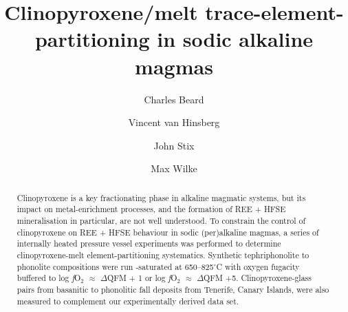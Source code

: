 \documentclass[review,authoryear,12pt]{elsarticle}
\newcommand{\dgC}{$^\circ$C }
\newcommand{\fO}{\textit{f}O$_{2}$ }
\begin{document}
\begin{frontmatter}


%

\title{Clinopyroxene/melt trace-element-partitioning in sodic alkaline magmas}


\author[1]{Charles Beard}

\author[1]{Vincent van Hinsberg}
\author[1]{John Stix}
\author[2,3]{Max Wilke}

\address[1]{Earth and Planetary Sciences, McGill University, 3450 University Street, Montreal, Qu\'ebec, H3A 0E8, Canada}
\address[2]{Institut f\"ur Erd- und Umweltwissenschaften, Universit\"at Potsdam, Golm, Germany}
\address[3]{Chemie und Physik der Geomaterialien, Deutsches GeoForschungsZentrum GFZ, Potsdam, Germany}



\begin{abstract}
Clinopyroxene is a key fractionating phase in alkaline magmatic systems,
but its impact on metal-enrichment processes, and the formation of REE + HFSE mineralisation in particular, are not well understood.
To constrain the control of clinopyroxene on REE + HFSE behaviour in sodic (per)alkaline magmas, a series of internally heated pressure vessel experiments was performed to determine clinopyroxene-melt element-partitioning systematics. Synthetic tephriphonolite to phonolite compositions were run -saturated at 650--825\dgC with oxygen fugacity buffered to log \fO $\approx$ $\Delta$QFM + 1 or log \fO $\approx$ $\Delta$QFM +5. Clinopyroxene-glass pairs from basanitic to phonolitic fall deposits from Tenerife, Canary Islands, were also measured to complement our experimentally derived data set.


\end{abstract}
\end{frontmatter}
\end{document}
